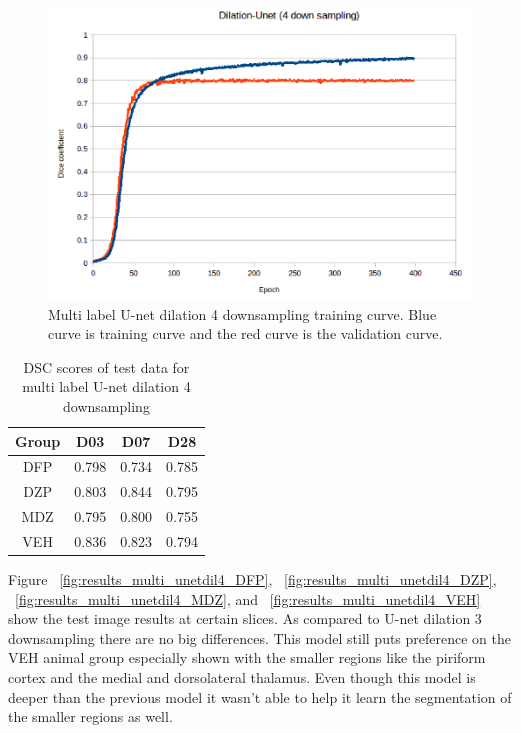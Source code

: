 \begin{figure}[!tbh]
\centering
\includegraphics[width=\textwidth]{results/train_results_multi_unetdil4.png}
\caption{Multi label U-net dilation 4 downsampling training curve. Blue curve is training curve and the red curve is the validation curve. }
\label{fig:results_multi_unetdil4_train}
\end{figure}

\begin{table}[tbh]
\renewcommand{\arraystretch}{1}
\centering
\begin{tabular}{|c|c|c|c|}
\hline
\textbf{Group} & \textbf{D03}& \textbf{D07}& \textbf{D28}\\
\hline
DFP & 0.798 & 0.734 & 0.785\\      
\hline
DZP & 0.803 & 0.844 & 0.795\\
\hline
MDZ & 0.795 & 0.800 & 0.755\\ 
\hline
VEH & 0.836 & 0.823 & 0.794\\ 
\hline
\end{tabular}
\caption{DSC scores of test data for multi label U-net dilation 4 downsampling}
\label{tab.multi_model_results_unetdil4}
\end{table}


Figure ~\ref{fig:results_multi_unetdil4_DFP}, ~\ref{fig:results_multi_unetdil4_DZP}, ~\ref{fig:results_multi_unetdil4_MDZ}, and ~\ref{fig:results_multi_unetdil4_VEH} show the test image results at certain slices. 
As compared to U-net dilation 3 downsampling there are no big differences. 
This model still puts preference on the VEH animal group especially shown with the smaller regions like the piriform cortex and the medial and dorsolateral thalamus.
Even though this model is deeper than the previous model it wasn't able to help it learn the segmentation of the smaller regions as well. 



